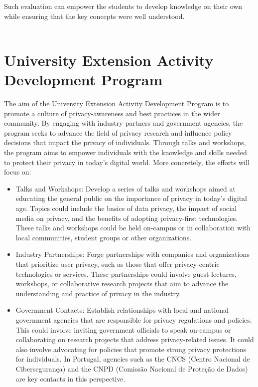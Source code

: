 \documentclass[11pt]{article}
\begin{document}
Such evaluation can empower the students to develop knowledge on their own while ensuring that the key concepts were well understood. \\\\

\section{University Extension Activity Development Program}

The aim of the University Extension Activity Development Program is to promote a culture of privacy-awareness and best practices in the wider community. By engaging with industry partners and government agencies, the program seeks to advance the field of privacy research and influence policy decisions that impact the privacy of individuals. Through talks and workshops, the program aims to empower individuals with the knowledge and skills needed to protect their privacy in today's digital world. More concretely, the efforts will focus on:
\begin{itemize}
    \item Talks and Workshops: Develop a series of talks and workshops aimed at educating the general public on the importance of privacy in today's digital age. Topics could include the basics of data privacy, the impact of social media on privacy, and the benefits of adopting privacy-first technologies. These talks and workshops could be held on-campus or in collaboration with local communities, student groups or other organizations.
    \item  Industry Partnerships: Forge partnerships with companies and organizations that prioritize user privacy, such as those that offer privacy-centric technologies or services. These partnerships could involve guest lectures, workshops, or collaborative research projects that aim to advance the understanding and practice of privacy in the industry.
    \item  Government Contacts: Establish relationships with local and national government agencies that are responsible for privacy regulations and policies. This could involve inviting government officials to speak on-campus or collaborating on research projects that address privacy-related issues. It could also involve advocating for policies that promote strong privacy protections for individuals. In Portugal, agencies such as the CNCS (Centro Nacional de Cibersegurança) and the CNPD (Comissão Nacional de Proteção de Dados) are key contacts in this perspective.
\end{itemize}
\end{document}
